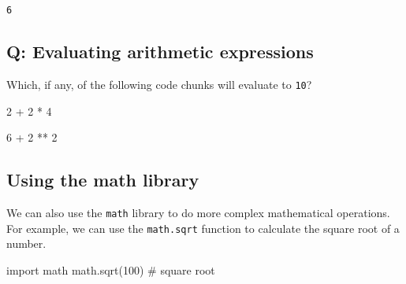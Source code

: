 \documentclass[
  letterpaper,
  DIV=11,
  numbers=noendperiod]{scrreprt}
\newenvironment{Shaded}{\begin{snugshade}}{\end{snugshade}}
\newcommand{\CommentTok}[1]{\textcolor[rgb]{0.37,0.37,0.37}{#1}}
\newcommand{\DecValTok}[1]{\textcolor[rgb]{0.68,0.00,0.00}{#1}}
\newcommand{\ImportTok}[1]{\textcolor[rgb]{0.00,0.46,0.62}{#1}}
\newcommand{\NormalTok}[1]{\textcolor[rgb]{0.00,0.23,0.31}{#1}}
\newcommand{\OperatorTok}[1]{\textcolor[rgb]{0.37,0.37,0.37}{#1}}
\begin{document}
\begin{verbatim}
6
\end{verbatim}

\begin{tcolorbox}[enhanced jigsaw, colframe=quarto-callout-tip-color-frame, opacityback=0, titlerule=0mm, bottomrule=.15mm, breakable, leftrule=.75mm, colbacktitle=quarto-callout-tip-color!10!white, title=\textcolor{quarto-callout-tip-color}{\faLightbulb}\hspace{0.5em}{Practice}, rightrule=.15mm, coltitle=black, opacitybacktitle=0.6, colback=white, left=2mm, arc=.35mm, toptitle=1mm, bottomtitle=1mm, toprule=.15mm]

\subsection{Q: Evaluating arithmetic
expressions}\label{q-evaluating-arithmetic-expressions}

Which, if any, of the following code chunks will evaluate to
\texttt{10}?

\begin{Shaded}
\begin{Highlighting}[]
\DecValTok{2} \OperatorTok{+} \DecValTok{2} \OperatorTok{*} \DecValTok{4}
\end{Highlighting}
\end{Shaded}

\begin{Shaded}
\begin{Highlighting}[]
\DecValTok{6} \OperatorTok{+} \DecValTok{2} \OperatorTok{**} \DecValTok{2}
\end{Highlighting}
\end{Shaded}

\end{tcolorbox}

\subsection{Using the math library}\label{using-the-math-library}

We can also use the \texttt{math} library to do more complex
mathematical operations. For example, we can use the \texttt{math.sqrt}
function to calculate the square root of a number.

\begin{Shaded}
\begin{Highlighting}[]
\ImportTok{import}\NormalTok{ math}
\NormalTok{math.sqrt(}\DecValTok{100}\NormalTok{)  }\CommentTok{\# square root}
\end{Highlighting}
\end{Shaded}
\end{document}

